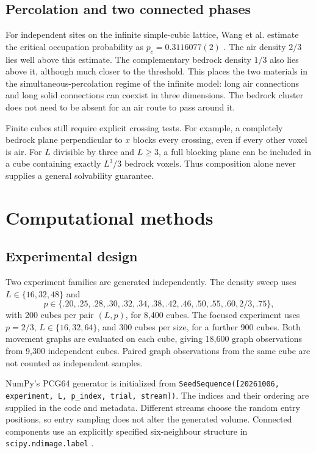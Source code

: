 \documentclass[11pt,letterpaper]{article}
\begin{document}
\subsection{Percolation and two connected phases}
For independent sites on the infinite simple-cubic lattice, Wang et al.
estimate the critical occupation probability as
$p_c=0.3116077(2)$ \citep{wang2013}. The air density $2/3$ lies well above
this estimate. The complementary bedrock density $1/3$ also lies above it,
although much closer to the threshold. This places the two materials in the
simultaneous-percolation regime of the infinite model: long air connections
and long solid connections can coexist in three dimensions.
The bedrock cluster does not need to be absent for an air route to pass around it.

Finite cubes still require explicit crossing tests. For example, a completely
bedrock plane perpendicular to $x$ blocks every crossing, even if every other
voxel is air. For $L$ divisible by three and $L\geq3$, a full blocking plane
can be included in a cube containing exactly $L^3/3$ bedrock voxels.
Thus composition alone never supplies a general solvability guarantee.

\section{Computational methods}
\subsection{Experimental design}
Two experiment families are generated independently.
The density sweep uses $L\in\{16,32,48\}$ and
\[
 p\in\{.20,.25,.28,.30,.32,.34,.38,.42,.46,.50,.55,.60,2/3,.75\},
\]
with 200 cubes per pair $(L,p)$, for 8,400 cubes.
The focused experiment uses $p=2/3$, $L\in\{16,32,64\}$,
and 300 cubes per size, for a further 900 cubes.
Both movement graphs are evaluated on each cube, giving 18,600 graph
observations from 9,300 independent cubes. Paired graph observations from the
same cube are not counted as independent samples.

NumPy's PCG64 generator is initialized from
\texttt{SeedSequence([20261006, experiment, L, p\_index, trial, stream])}.
The indices and their ordering are supplied in the code and metadata.
Different streams choose the random entry positions, so entry sampling does not
alter the generated volume. Connected components use an explicitly specified
six-neighbour structure in \texttt{scipy.ndimage.label} \citep{scipylabel}.
\end{document}
